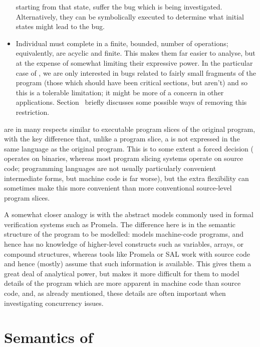 \begin{itemize}
  starting from that state, suffer the bug which is being
  investigated.  Alternatively, they can be symbolically executed to
  determine what initial states might lead to the bug.
\item
  Individual \StateMachines must complete in a finite, bounded, number
  of operations; equivalently, \StateMachines are acyclic and finite.
  This makes them far easier to analyse, but at the expense of
  somewhat limiting their expressive power.  In the particular case of
  \technique{}, we are only interested in bugs related to fairly small
  fragments of the program (those which should have been critical
  sections, but aren't) and so this is a tolerable limitation; it
  might be more of a concern in other applications.
  Section~ briefly discusses some possible ways of removing
  this restriction.
\end{itemize}

\STateMachines are in many respects similar to executable program
slices of the original program, with the key difference that, unlike a
program slice, a \StateMachine is not expressed in the same language
as the original program.  This is to some extent a forced decision
({\technique} operates on binaries, whereas most program slicing
systems operate on source code; programming languages are not usually
particularly convenient intermediate forms, but machine code is far
worse), but the extra flexibility can sometimes make this more
convenient than more conventional source-level program
slices.

A somewhat closer analogy is with the abstract models commonly used in
formal verification systems such as Promela\needCite{}.  The
difference here is in the semantic structure of the program to be
modelled: \technique{} models machine-code programs, and hence has no
knowledge of higher-level constructs such as variables, arrays, or
compound structures, whereas tools like Promela or SAL\needCite{} work
with source code and hence (mostly) assume that such information is
available.  This gives them a great deal of analytical power, but
makes it more difficult for them to model details of the program which
are more apparent in machine code than source code, and, as already
mentioned, these details are often important when investigating
concurrency issues.


\section{Semantics of {\StateMachines}}

